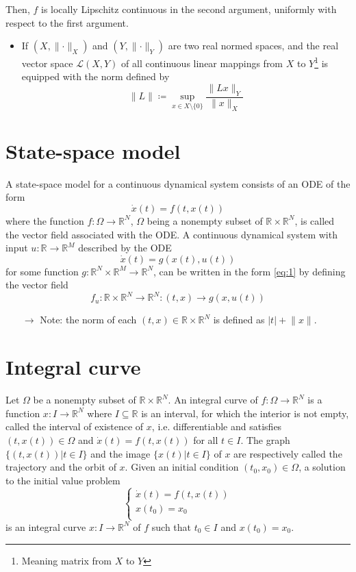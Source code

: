 \documentclass[12pt, openany]{report}
\theoremstyle{definition}
\newcommand{\R}{\mathbb{R}}
\begin{document}
Then, \(f\) is locally Lipschitz continuous in the second argument, uniformly with respect to the first argument.
\begin{itemize}
    \item If \((X,\lVert \cdot \rVert_X)\) and \((Y,\lVert \cdot \rVert_Y)\) are two real normed spaces, and the real vector space \(\mathcal{L}(X,Y)\) of all continuous linear mappings from \(X\) to \(Y\)\footnote{Meaning matrix from \(X\) to \(Y\)} is equipped with the norm defined by \[\lVert L\rVert \coloneqq \sup_{x\in X\setminus\{0\}}\frac{\lVert Lx\rVert_Y}{\lVert x\rVert_X}\]
\end{itemize}
\section{State-space model}
A state-space model for a continuous dynamical system consists of an ODE of the form 
\begin{equation}\label{eq:1}
    \dot x (t) = f(t,x(t))
\end{equation}
where the function \(f:\Omega\rightarrow \R^N\), \(\Omega\) being a nonempty subset of \(\R\times \R^N\), is called the vector field associated with the ODE.
A continuous dynamical system with input \(u:\R\rightarrow \R^M\) described by the ODE 
\begin{equation}
    \dot x(t) = g(x(t),u(t))
\end{equation}
for some function \(g:\R^N\times \R^M\rightarrow \R^N\), can be written in the form \eqref{eq:1} by defining the vector field
\begin{equation}
    f_u :\R\times \R^N \rightarrow \R^N :(t,x) \rightarrow g(x,u(t))
\end{equation}
\begin{itemize}
    \item [\(\rightarrow\)] Note: the norm of each \((t,x)\in \R\times \R^N\)  is defined as \(|t|+\lVert x\rVert\).
\end{itemize}
\section{Integral curve}
Let \(\Omega\) be a nonempty subset of \(\R\times \R^N\). An integral curve of \(f:\Omega\rightarrow \R^N\) is a function \(x:I\rightarrow \R^N\) where \(I\subseteq \R\) is an interval, for which the interior is not empty, called the interval of existence of \(x\), i.e. differentiable and satisfies \((t,x(t))\in \Omega\) and \(\dot x(t) = f(t,x(t))\) for all \(t\in I\). The graph \(\{(t,x(t))|t\in I\}\) and the image \(\{x(t)|t\in I\}\) of \(x\) are respectively called the trajectory and the orbit of \(x\). Given an initial condition \((t_0,x_0)\in \Omega\), a solution to the initial value problem 
\begin{equation}
    \begin{cases}
        \dot x(t) = f(t,x(t))\\
        x(t_0) = x_0\\
    \end{cases}
\end{equation}
is an integral curve \(x:I\rightarrow \R^N\) of \(f\) such that \(t_0\in I\) and \(x(t_0)=x_0\). \\
\end{document}
